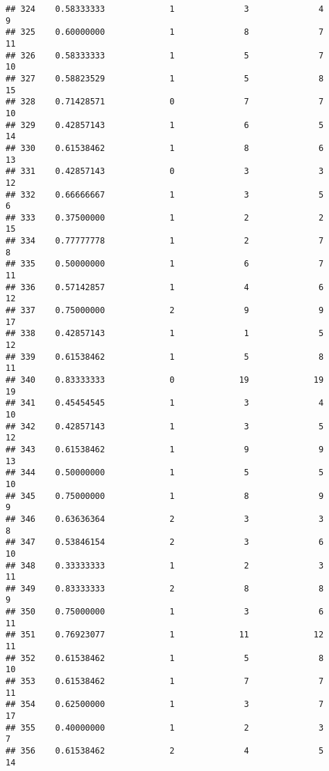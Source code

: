 \documentclass[
]{article}
\begin{document}
\begin{verbatim}
## 324    0.58333333             1              3              4              9
## 325    0.60000000             1              8              7             11
## 326    0.58333333             1              5              7             10
## 327    0.58823529             1              5              8             15
## 328    0.71428571             0              7              7             10
## 329    0.42857143             1              6              5             14
## 330    0.61538462             1              8              6             13
## 331    0.42857143             0              3              3             12
## 332    0.66666667             1              3              5              6
## 333    0.37500000             1              2              2             15
## 334    0.77777778             1              2              7              8
## 335    0.50000000             1              6              7             11
## 336    0.57142857             1              4              6             12
## 337    0.75000000             2              9              9             17
## 338    0.42857143             1              1              5             12
## 339    0.61538462             1              5              8             11
## 340    0.83333333             0             19             19             19
## 341    0.45454545             1              3              4             10
## 342    0.42857143             1              3              5             12
## 343    0.61538462             1              9              9             13
## 344    0.50000000             1              5              5             10
## 345    0.75000000             1              8              9              9
## 346    0.63636364             2              3              3              8
## 347    0.53846154             2              3              6             10
## 348    0.33333333             1              2              3             11
## 349    0.83333333             2              8              8              9
## 350    0.75000000             1              3              6             11
## 351    0.76923077             1             11             12             11
## 352    0.61538462             1              5              8             10
## 353    0.61538462             1              7              7             11
## 354    0.62500000             1              3              7             17
## 355    0.40000000             1              2              3              7
## 356    0.61538462             2              4              5             14

\end{verbatim}
\end{document}
